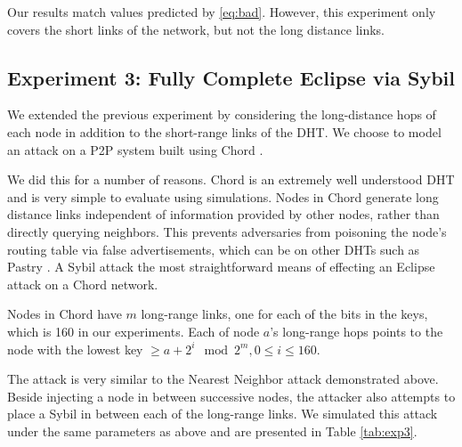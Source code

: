 \documentclass[11pt,conference]{IEEEtran}
\begin{document}
Our results match values predicted by \ref{eq:bad}.
However, this experiment only covers the short links of the network, but not the long distance links.



\subsection{Experiment 3: Fully Complete Eclipse via Sybil}
\label{sec:chord}
We extended the previous experiment by considering the long-distance hops of each node in addition to the short-range links of the DHT.
We choose to model an attack on a P2P system built using Chord \cite{chord}.


We did this for a number of reasons.
Chord is an extremely well understood DHT and is very simple to evaluate using simulations.
Nodes in Chord generate long distance links independent of information provided by other nodes, rather than directly querying neighbors.
This prevents adversaries from poisoning the node's routing table via false advertisements, which can be on other DHTs such as Pastry \cite{pastry}. 
A Sybil attack the most straightforward means of effecting an Eclipse attack on a Chord network.

Nodes in Chord have $m$ long-range links, one for each of the bits in the keys, which is 160 in our experiments.
Each of node $a$'s long-range hops points to the node with the lowest key $\geq a + 2^{i} \mod 2^{m}, 0 \leq i \leq 160$.


The attack is very similar to the Nearest Neighbor attack demonstrated above.
Beside injecting a node in between successive nodes, the attacker also attempts to place a Sybil in between each of the long-range links.
We simulated this attack under the same parameters as above and are presented in Table \ref{tab:exp3}.
\end{document}
